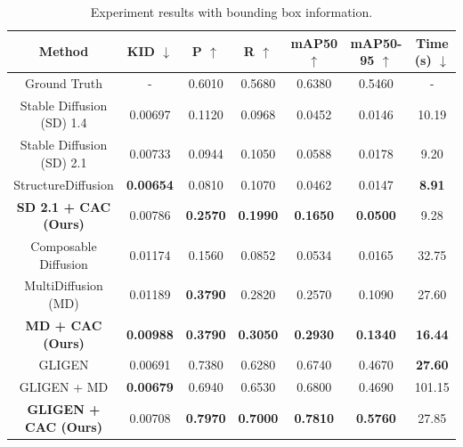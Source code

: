 \begin{table}[t]
\caption{\small Experiment results with bounding box information.}
\label{tab:bbox_results}
\centering
\small
\begin{tabular}{@{}ccccccc@{}}
\toprule
\textbf{Method}                     & \textbf{KID $\downarrow$}     & \textbf{P $\uparrow$} & \textbf{R $\uparrow$} & \textbf{mAP50 $\uparrow$}  & \textbf{mAP50-95 $\uparrow$} & \textbf{Time (s) $\downarrow$}\\ \midrule
Ground Truth                        & -                & 0.6010             & 0.5680          & 0.6380          & 0.5460    & -            \\ \midrule
Stable Diffusion (SD) 1.4                & 0.00697          & 0.1120             & 0.0968          & 0.0452          & 0.0146      & 10.19      \\
Stable Diffusion (SD) 2.1                & 0.00733          & 0.0944             & 0.1050          & 0.0588          & 0.0178      & 9.20      \\
StructureDiffusion                  & \textbf{0.00654} & 0.0810             & 0.1070          & 0.0462          & 0.0147      &   \textbf{8.91}      \\ 
\textbf{SD 2.1 + CAC (Ours)} & 0.00786          & \textbf{0.2570}    & \textbf{0.1990} & \textbf{0.1650} & \textbf{0.0500}   &   9.28   \\ \midrule
Composable Diffusion                & 0.01174          & 0.1560             & 0.0852          & 0.0534          & 0.0165       & 32.75     \\
MultiDiffusion (MD)                      & 0.01189          & \textbf{0.3790}    & 0.2820          & 0.2570          & 0.1090      & 27.60      \\
\textbf{MD + CAC (Ours)}       & \textbf{0.00988} & \textbf{0.3790}    & \textbf{0.3050} & \textbf{0.2930} & \textbf{0.1340}  & \textbf{16.44} \\ \midrule
GLIGEN                              & 0.00691          & 0.7380             & 0.6280          & 0.6740          & 0.4670       & \textbf{27.60}     \\
GLIGEN + MD                         & \textbf{0.00679} & 0.6940             & 0.6530          & 0.6800          & 0.4690       & 101.15     \\
\textbf{GLIGEN + CAC (Ours)}               & 0.00708          & \textbf{0.7970}    & \textbf{0.7000} & \textbf{0.7810} & \textbf{0.5760}  & 27.85 \\ \bottomrule
\end{tabular}
\end{table}

